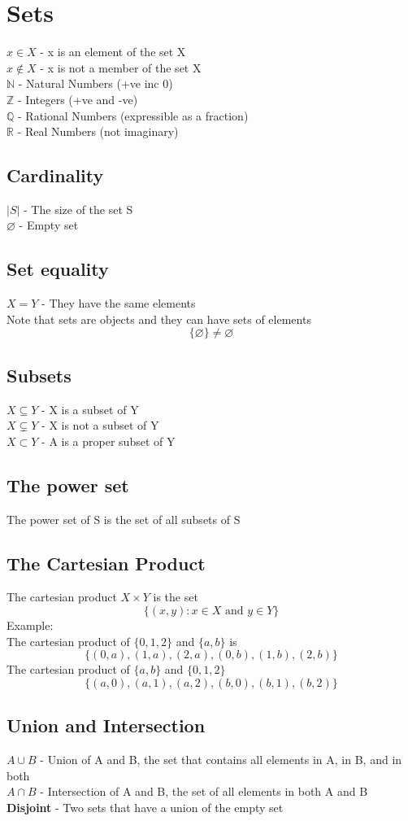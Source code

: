 \documentclass{article}[18pt]
\begin{document}
\section{Sets}
$x\in X$  - x is an element of the set X\\
$x\notin X$ - x is not a member of the set X\\
$\mathbb{N}$ - Natural Numbers (+ve inc 0)\\
$\mathbb{Z}$ - Integers (+ve and -ve)\\
$\mathbb{Q}$ - Rational Numbers (expressible as a fraction)\\
$\mathbb{R}$ - Real Numbers (not imaginary)
\subsection{Cardinality}
$|S|$ - The size of the set S\\
$\varnothing$ - Empty set
\subsection{Set equality}
$X=Y$ - They have the same elements\\
Note that sets are objects and they can have sets of elements
$$\{\varnothing\}\neq \varnothing$$
\subsection{Subsets}
$X\subseteq Y$ - X is a subset of Y\\
$X\subsetneq Y$ - X is not a subset of Y\\
$X\subset Y$ - A is a proper subset of Y
\subsection{The power set}
The power set of S is the set of all subsets of S 
\subsection{The Cartesian Product}
The cartesian product $X\times Y$ is the set
\[
\{(x, y) : x \in X \text { and } y \in Y\}
\]
Example:\\
The cartesian product of $\{0,1,2\}$ and $\{a,b\}$ is
\[
\{(0, a),(1, a),(2, a),(0, b),(1, b),(2, b)\}
\]
The cartesian product of $\{a,b\}$ and $\{0,1,2\}$
\[
\{(a, 0),(a, 1),(a, 2),(b, 0),(b, 1),(b, 2)\}
\]
\subsection{Union and Intersection}
$A\cup B$ - Union of A and B, the set that contains all elements in A, in B, and in both\\
$A\cap B$ - Intersection of A and B, the set of all elements in both A and B\\
\textbf{Disjoint} - Two sets that have a union of the empty set
\end{document}
